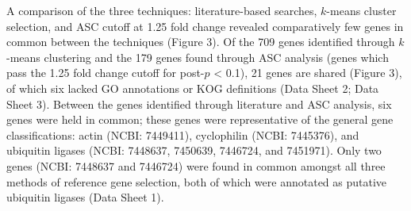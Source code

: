 A comparison of the three techniques: literature-based searches, $k$-means cluster selection, and ASC cutoff at 1.25 fold change revealed comparatively few genes in common between the techniques (Figure 3). Of the 709 genes identified through $k$-means clustering and the 179 genes found through ASC analysis (genes which pass the 1.25 fold change cutoff for post-$p$ < 0.1), 21 genes are shared (Figure 3), of which six lacked GO annotations or KOG definitions (Data Sheet 2; Data Sheet 3). Between the genes identified through literature and ASC analysis, six genes were held in common; these genes were representative of the general gene classifications: actin (NCBI: 7449411), cyclophilin (NCBI: 7445376), and ubiquitin ligases (NCBI: 7448637, 7450639, 7446724, and 7451971). Only two genes (NCBI: 7448637 and 7446724) were found in common amongst all three methods of reference gene selection, both of which were annotated as putative ubiquitin ligases (Data Sheet 1). \par

